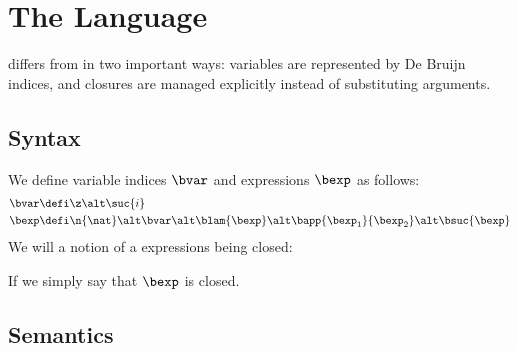 \section{The \textnormal{\blang} Language}

\blang differs from \hlang in two important ways: variables are represented by De Bruijn indices, and closures are managed explicitly instead of substituting arguments.


\subsection{Syntax}

We define variable indices $\bvar$ and \blang expressions $\bexp$ as follows:
\begin{align*}
	\bvar &\defi \z \alt \suc{i} \\
	\bexp &\defi \n{\nat} \alt \bvar \alt \blam{\bexp} \alt \bapp{\bexp_1}{\bexp_2} \alt \bsuc{\bexp}
\end{align*}
We will a notion of a \blang expressions being closed:

\vspace{0.5cm}


\begin{prooftree}
\end{prooftree}

\begin{prooftree}
\end{prooftree}

\begin{prooftree}
\end{prooftree}

\begin{prooftree}
\end{prooftree}

\begin{prooftree}
\end{prooftree}

If  we simply say that $\bexp$ is closed.

\subsection{Semantics}

